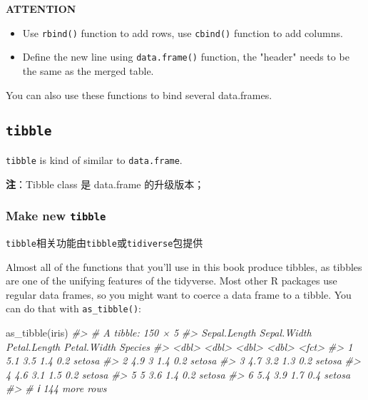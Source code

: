 \documentclass[
]{article}
\newenvironment{Shaded}{}{}
\newcommand{\CommentTok}[1]{\textcolor[rgb]{0.38,0.63,0.69}{\textit{#1}}}
\newcommand{\FunctionTok}[1]{\textcolor[rgb]{0.02,0.16,0.49}{#1}}
\newcommand{\NormalTok}[1]{#1}
\begin{document}
\textbf{ATTENTION}

\begin{itemize}
\item
  Use \texttt{rbind()} function to add rows, use \texttt{cbind()}
  function to add columns.
\item
  Define the new line using \texttt{data.frame()} function, the "header"
  needs to be the same as the merged table.
\end{itemize}

You can also use these functions to bind several data.frames.

\hypertarget{tibble}{%
\subsection{\texorpdfstring{\texttt{tibble}}{tibble}}\label{tibble}}

\texttt{tibble} is kind of similar to \texttt{data.frame}.

\textbf{注}：Tibble class 是 data.frame 的升级版本；

\hypertarget{make-new-tibble}{%
\subsubsection{\texorpdfstring{Make new
\texttt{tibble}}{Make new tibble}}\label{make-new-tibble}}

\texttt{tibble}相关功能由\texttt{tibble}或\texttt{tidiverse}包提供

Almost all of the functions that you'll use in this book produce
tibbles, as tibbles are one of the unifying features of the tidyverse.
Most other R packages use regular data frames, so you might want to
coerce a data frame to a tibble. You can do that with
\texttt{as\_tibble()}:

\begin{Shaded}
\begin{Highlighting}[]
\FunctionTok{as\_tibble}\NormalTok{(iris)}
\CommentTok{\#\textgreater{} \# A tibble: 150 × 5}
\CommentTok{\#\textgreater{}   Sepal.Length Sepal.Width Petal.Length Petal.Width Species}
\CommentTok{\#\textgreater{}          \textless{}dbl\textgreater{}       \textless{}dbl\textgreater{}        \textless{}dbl\textgreater{}       \textless{}dbl\textgreater{} \textless{}fct\textgreater{}  }
\CommentTok{\#\textgreater{} 1          5.1         3.5          1.4         0.2 setosa }
\CommentTok{\#\textgreater{} 2          4.9         3            1.4         0.2 setosa }
\CommentTok{\#\textgreater{} 3          4.7         3.2          1.3         0.2 setosa }
\CommentTok{\#\textgreater{} 4          4.6         3.1          1.5         0.2 setosa }
\CommentTok{\#\textgreater{} 5          5           3.6          1.4         0.2 setosa }
\CommentTok{\#\textgreater{} 6          5.4         3.9          1.7         0.4 setosa }
\CommentTok{\#\textgreater{} \# ℹ 144 more rows}
\end{Highlighting}
\end{Shaded}
\end{document}
